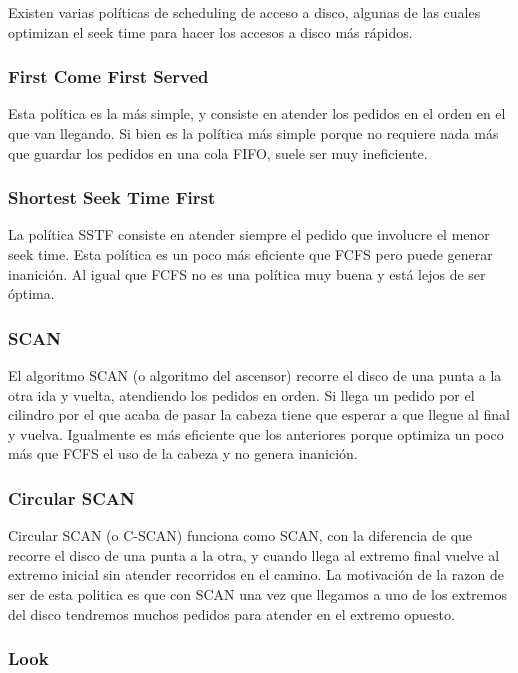 \documentclass{article}
\begin{document}
Existen varias pol\'iticas de scheduling de acceso a disco, algunas de las cuales optimizan el seek time para hacer los accesos a disco m\'as r\'apidos.

\subsubsection{First Come First Served}

Esta pol\'itica es la m\'as simple, y consiste en atender los pedidos en el orden en el que van llegando. Si bien es la pol\'itica m\'as simple porque no requiere nada m\'as que guardar los pedidos en una cola FIFO, suele ser muy ineficiente.

\subsubsection{Shortest Seek Time First}

La pol\'itica SSTF consiste en atender siempre el pedido que involucre el menor seek time. Esta pol\'itica es un poco m\'as eficiente que FCFS pero puede generar inanici\'on. Al igual que FCFS no es una pol\'itica muy buena y est\'a lejos de ser \'optima.

\subsubsection{SCAN}

El algoritmo SCAN (o algoritmo del ascensor) recorre el disco de una punta a la otra ida y vuelta, atendiendo los pedidos en orden. Si llega un pedido por el cilindro por el que acaba de pasar la cabeza tiene que esperar a que llegue al final y vuelva. Igualmente es m\'as eficiente que los anteriores porque optimiza un poco m\'as que FCFS el uso de la cabeza y no genera inanici\'on.

\subsubsection{Circular SCAN}

Circular SCAN (o C-SCAN) funciona como SCAN, con la diferencia de que recorre el disco de una punta a la otra, y cuando llega al extremo final vuelve al extremo inicial sin atender recorridos en el camino. La motivación de la razon de ser de esta politica es que con SCAN una vez que llegamos a uno de los extremos del disco tendremos muchos pedidos para atender en el extremo opuesto.

\subsubsection{Look}
\end{document}
